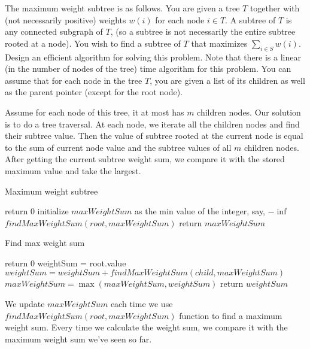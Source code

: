 \newpage
{} %

\problemdes

The maximum weight subtree is as follows. You are given a tree $T$ together with (not necessarily positive) weights $w(i)$ for each node $i \in T$. A subtree of $T$ is any connected subgraph of $T$, (so a subtree is not necessarily the entire subtree rooted at a node). You wish to find a subtree of $T$ that maximizes $\sum_{i \in S} w(i)$. Design an efficient algorithm for solving this problem. Note that there is a linear (in the number of nodes of the tree) time algorithm for this problem. You can assume that for each node in the tree $T$, you are given a list of its children as well as the parent pointer (except for the root node).

\solution


Assume for each node of this tree, it at most has $m$ children nodes. Our solution is to do a tree traversal. At each node, we iterate all the children nodes and find their subtree value. Then the value of subtree rooted at the current node is equal to the sum of current node value and the subtree values of all $m$ children nodes. After getting the current subtree weight sum, we compare it with the stored maximum value and take the largest.


\begin{algorithm}[]
  \caption{Maximum weight subtree}
  {
  	return $0$\;
  }
  initialize $maxWeightSum$ as the min value of the integer, say, $-\inf$\;
  $findMaxWeightSum(root, maxWeightSum)$\;
  return $maxWeightSum$\;
\end{algorithm}

\begin{algorithm}[]
  \caption{Find max weight sum}
  {
  	return $0$\;
  }
  weightSum = root.value\;
  {
  	$weightSum = weightSum + findMaxWeightSum(child, maxWeightSum)$
  }
  $maxWeightSum = \max(maxWeightSum, weightSum)$
  return $weightSum$\;
\end{algorithm}



We update $maxWeightSum$ each time we use $findMaxWeightSum(root, maxWeightSum)$ function to find a maximum weight sum. Every time we calculate the weight sum, we compare it with the maximum weight sum we've seen so far.

